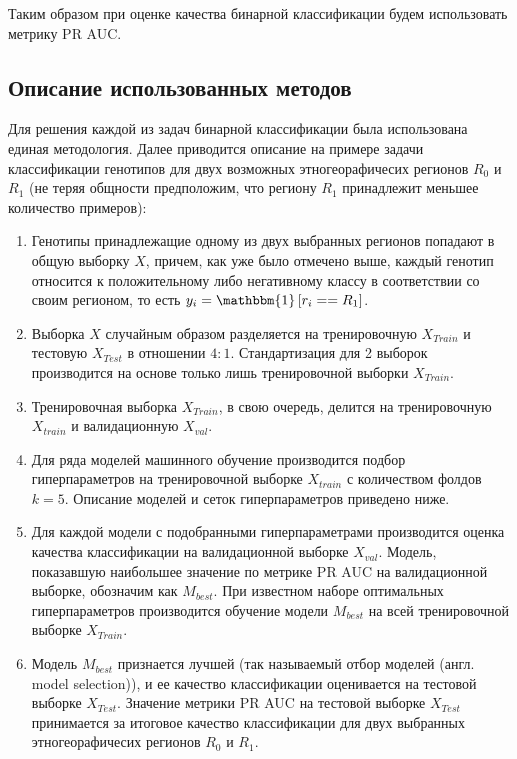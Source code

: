 Таким образом при оценке качества бинарной классификации будем использовать метрику PR AUC.

\subsection{Описание использованных методов}

Для решения каждой из задач бинарной классификации была использована единая методология.
Далее приводится описание на примере задачи классификации генотипов для двух возможных
этногеорафичесих регионов $R_{0}$ и $R_{1}$ (не теряя общности предположим, что региону $R_{1}$
принадлежит меньшее количество примеров):

\begin{enumerate}
\item Генотипы принадлежащие одному из двух выбранных регионов попадают в общую выборку $X$,
причем, как уже было отмечено выше, каждый генотип относится к положительному либо
негативному классу в соответствии со своим регионом, то есть $y_{i} = \mathbbm{1} \left[ r_{i} == R_{1} \right]$.

\item Выборка $X$ случайным образом разделяется на тренировочную $X_{Train}$ и тестовую $X_{Test}$
в отношении $4:1$. Стандартизация для 2 выборок производится на основе только лишь
тренировочной выборки $X_{Train}$.

\item Тренировочная выборка $X_{Train}$, в свою очередь, делится на тренировочную $X_{train}$ и
валидационную $X_{val}$.

\item Для ряда моделей машинного обучение производится подбор гиперпараметров на тренировочной выборке
$X_{train}$ с количеством фолдов $k=5$. Описание моделей и сеток гиперпараметров приведено ниже.

\item Для каждой модели с подобранными гиперпараметрами производится оценка качества классификации
на валидационной выборке $X_{val}$. Модель, показавшую наибольшее значение по метрике PR AUC на валидационной
выборке, обозначим как $M_{best}$. При известном наборе оптимальных гиперпараметров производится обучение
модели $M_{best}$ на всей тренировочной выборке $X_{Train}$.

\item Модель $M_{best}$ признается лучшей (так называемый отбор моделей
(англ. model selection)), и ее качество классификации оценивается на тестовой выборке $X_{Test}$.
Значение метрики PR AUC на тестовой выборке $X_{Test}$ принимается за итоговое качество классификации
для двух выбранных этногеорафичесих регионов $R_{0}$ и $R_{1}$.

\end{enumerate}

